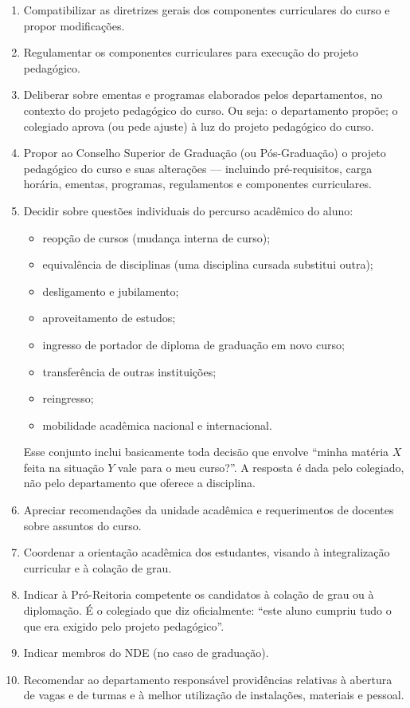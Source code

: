 \documentclass[10pt,a4paper]{extarticle}
\newcommand{\impt}[1]{\textcolor{important}{#1}}
\newcommand{\ntc}[1]{\textcolor{notice}{#1}}
\begin{document}
\begin{enumerate}[label=(\arabic*)]
    \item \impt{Compatibilizar as diretrizes gerais dos componentes curriculares} do curso e propor modificações.
    \item \impt{Regulamentar os componentes curriculares} para execução do projeto pedagógico.
    \item \impt{Deliberar sobre ementas e programas} elaborados pelos departamentos, no contexto do projeto pedagógico do curso. \ntc{Ou seja: o departamento propõe; o colegiado aprova (ou pede ajuste) à luz do projeto pedagógico do curso.}
    \item \impt{Propor ao Conselho Superior de Graduação (ou Pós-Graduação)} o projeto pedagógico do curso e suas alterações --- incluindo pré-requisitos, carga horária, ementas, programas, regulamentos e componentes curriculares.
    \item Decidir sobre questões individuais do percurso acadêmico do aluno:
    \begin{itemize}
        \item \impt{reopção} de cursos (mudança interna de curso);
        \item \impt{equivalência de disciplinas} (uma disciplina cursada substitui outra);
        \item \impt{desligamento e jubilamento};
        \item \impt{aproveitamento de estudos};
        \item ingresso de \impt{portador de diploma} de graduação em novo curso;
        \item \impt{transferência} de outras instituições;
        \item \impt{reingresso};
        \item \impt{mobilidade acadêmica} nacional e internacional.
    \end{itemize}
    \ntc{Esse conjunto inclui basicamente toda decisão que envolve ``minha matéria $X$ feita na situação $Y$ vale para o meu curso?''. A resposta é dada pelo colegiado, não pelo departamento que oferece a disciplina.}
    \item Apreciar recomendações da unidade acadêmica e requerimentos de docentes sobre assuntos do curso.
    \item \impt{Coordenar a orientação acadêmica} dos estudantes, visando à integralização curricular e à colação de grau.
    \item \impt{Indicar à Pró-Reitoria competente os candidatos à colação de grau} ou à diplomação. É o colegiado que diz oficialmente: ``este aluno cumpriu tudo o que era exigido pelo projeto pedagógico''.
    \item Indicar membros do NDE (no caso de graduação).
    \item Recomendar ao departamento responsável providências relativas à \impt{abertura de vagas e de turmas} e à melhor utilização de instalações, materiais e pessoal.
\end{enumerate}
\end{document}
